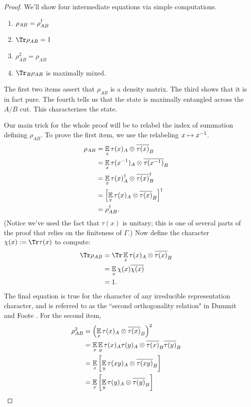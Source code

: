 \begin{proof}
	We'll show four intermediate equations via simple computations.
	\begin{enumerate}
		\item $\rho_{AB} = \rho_{AB}^\dagger$
		\item $\Tr \rho_{AB} = 1$
		\item $\rho_{AB}^2 = \rho_{AB}$
		\item $\Tr_B \rho_{AB}$ is maximally mixed.
	\end{enumerate}
	The first two items assert that $\rho_{AB}$ is a density matrix. The third shows that it is in fact pure. The fourth tells us that the state is maximally entangled across the $A/B$ cut. This characterizes the state.

	Our main trick for the whole proof will be to relabel the index of summation defining $\rho_{AB}$. 
	To prove the first item, we use the relabeling $x\mapsto x^{-1}$. 
	\begin{align*}
		\rho_{AB} 
		&= \operatorname*{\mathbb E}\limits_{x} \tau(x)_A \otimes \overline{\tau(x)}_B
		\\&= \operatorname*{\mathbb E}\limits_{x} \tau(x^{-1})_A \otimes \overline{\tau(x^{-1})}_B
		\\&= \operatorname*{\mathbb E}\limits_{x} \tau(x)_A^\dagger \otimes \overline{\tau(x)}_B^\dagger
		\\&= \left[\operatorname*{\mathbb E}\limits_{x} \tau(x)_A \otimes \overline{\tau(x)}_B\right]^\dagger
		\\&= \rho_{AB}^\dagger.
	\end{align*}
	(Notice we've used the fact that $\tau(x)$ is unitary; this is one of several parts of the proof that relies on the finiteness of $\Gamma$.) Now define the character $\chi(x):= \Tr \tau(x)$ to compute:
	\begin{align*}
		\Tr \rho_{AB}
		&= \Tr \E x \tau(x)_A \otimes \bar{\tau(x)}_B
		\\&= \E x \chi(x) \bar{\chi(x)}
		\\&= 1.
	\end{align*}
	The final equation is true for the character of any irreducible representation character, and is referred to as the ``second orthogonality relation" in Dummit and Foote \cite{dummit2004abstract}. For the second item,
	\begin{align*}
		\rho_{AB}^2 
		&= \left(\E x \tau(x)_A \otimes \bar{\tau(x)}_B\right)^2
		\\&= \E x\E y \tau(x)_A\tau(y)_A \otimes \bar{\tau(x)}_B\bar{\tau(y)}_B
		\\&= \E x\left[\E y \tau(xy)_A \otimes \bar{\tau(xy)}_B\right]
		\\&= \E x\left[\E y \tau(y)_A \otimes \bar{\tau(y)}_B\right]

\end{align*}
\end{proof}
